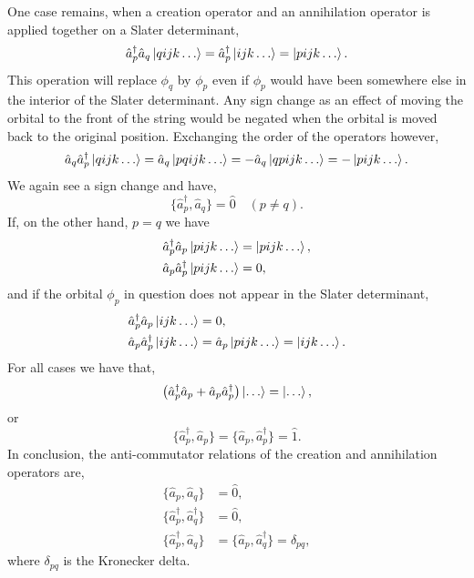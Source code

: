     One case remains, when a creation operator and an annihilation operator is
    applied together on a Slater determinant,
    \begin{equation}
        \hat{a}_p^\dagger \hat{a}_q \ket{qijk \dots} 
            = \hat{a}_p^\dagger \ket{ijk \dots}
            = \ket{pijk \dots}.
    \end{equation}
    This operation will replace $\phi_q$ by $\phi_p$ even if $\phi_p$ would have
    been somewhere else in the interior of the Slater determinant. Any sign change
    as an effect of moving the orbital to the front of the string would be negated
    when the orbital is moved back to the original position. Exchanging the order
    of the operators however,
    \begin{equation}
        \hat{a}_q \hat{a}_p^\dagger \ket{qijk \dots} 
            = \hat{a}_q \ket{pqijk \dots} 
            = -\hat{a}_q \ket{qpijk \dots}
            = -\ket{pijk \dots}.
    \end{equation}
    We again see a sign change and have,
    \begin{equation}
        \{\hat{a}_p^\dagger, \hat{a}_q\} = \hat{0} \quad (p \neq q).
    \end{equation}
    If, on the other hand, $p=q$ we have 
    \begin{equation}
        \begin{aligned}
            \hat{a}_p^\dagger \hat{a}_p \ket{pijk \dots} &= \ket{pijk \dots}, \\
            \hat{a}_p \hat{a}_p^\dagger \ket{pijk \dots} &= 0,
        \end{aligned}
    \end{equation}
    and if the orbital $\phi_p$ in question does not appear in the Slater 
    determinant,
    \begin{equation}
        \begin{aligned}
            \hat{a}_p^\dagger \hat{a}_p \ket{ijk \dots} &= 0, \\
            \hat{a}_p \hat{a}_p^\dagger \ket{ijk \dots} &= 
                \hat{a}_p\ket{pijk \dots} = \ket{ijk \dots}.           
        \end{aligned}
    \end{equation} 
    For all cases we have that,
    \begin{equation}
        \left(\hat{a}_p^\dagger \hat{a}_p + \hat{a}_p \hat{a}_p^\dagger \right)
        \ket{\dots} = \ket{\dots},
    \end{equation}
    or
    \begin{equation}
        \{\hat{a}_p^\dagger, \hat{a}_p\} = \{\hat{a}_p, \hat{a}_p^\dagger\} = \hat{1}.
    \end{equation}
    In conclusion, the anti-commutator relations of the creation and annihilation
    operators are,
    \begin{align}
        \{\hat{a}_p, \hat{a}_q\} &= \hat{0}, \\
        \{\hat{a}_p^\dagger, \hat{a}_q^\dagger\} &= \hat{0}, \\
        \{\hat{a}_p^\dagger, \hat{a}_q\} &= \{\hat{a}_p, \hat{a}_q^\dagger\} 
         = \delta_{pq},
    \end{align}
    where $\delta_{pq}$ is the Kronecker delta.

